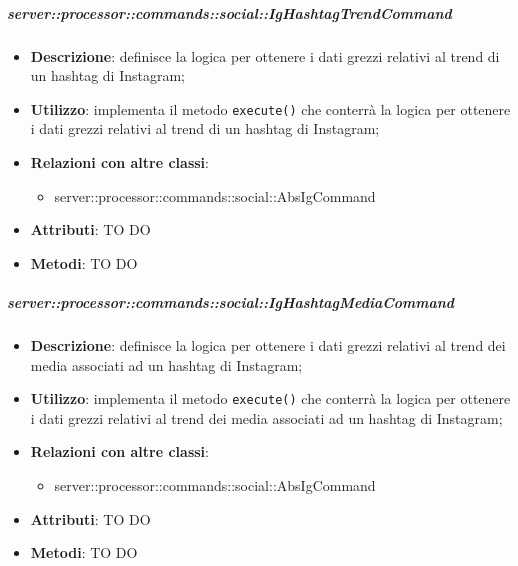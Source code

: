         \subparagraph{server::processor::commands::social::IgHashtagTrendCommand} %
        \label{subp:bdsm_app_server_processor_commands_social_ighashtagtrendcommand}
        \begin{itemize}
          \item \textbf{Descrizione}: definisce la logica per ottenere i dati grezzi relativi al trend di un hashtag di Instagram;
          \item \textbf{Utilizzo}: implementa il metodo \texttt{execute()} che conterrà la logica per ottenere i dati grezzi relativi al trend di un hashtag di Instagram;
          \item \textbf{Relazioni con altre classi}:
            \begin{itemize}
              \item server::processor::commands::social::AbsIgCommand
            \end{itemize}
			\item \textbf{Attributi}: TO DO
			\item \textbf{Metodi}: TO DO
        \end{itemize}

        \subparagraph{server::processor::commands::social::IgHashtagMediaCommand} %
        \label{subp:bdsm_app_server_processor_commands_social_twhashtagmediacommand}
        \begin{itemize}
          \item \textbf{Descrizione}: definisce la logica per ottenere i dati grezzi relativi al trend dei media associati ad un hashtag di Instagram;
          \item \textbf{Utilizzo}: implementa il metodo \texttt{execute()} che conterrà la logica per ottenere i dati grezzi relativi al trend dei media associati ad un hashtag di Instagram;
          \item \textbf{Relazioni con altre classi}:
            \begin{itemize}
              \item server::processor::commands::social::AbsIgCommand
            \end{itemize}
			\item \textbf{Attributi}: TO DO
			\item \textbf{Metodi}: TO DO
        \end{itemize}

